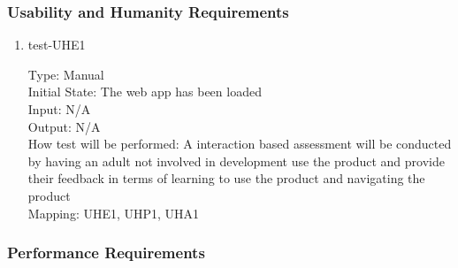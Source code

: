 \documentclass[12pt, titlepage]{article}
\begin{document}
\subsubsection{Usability and Humanity Requirements}

\begin{enumerate}
\item{test-UHE1\\}

Type: Manual\\
Initial State: The web app has been loaded\\
Input: N/A\\
Output: N/A\\
How test will be performed: A interaction based assessment will be conducted by having an adult not involved in development use the product and provide their feedback in terms of learning to use the product and navigating the product\\
Mapping: UHE1, UHP1, UHA1
\end{enumerate}

\subsubsection{Performance Requirements}
\end{document}
